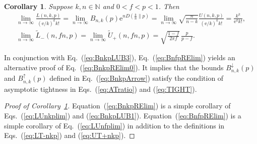 \documentclass[aop]{imsart}
\theoremstyle{plain}
\newtheorem{corollary}[theorem]{Corollary}
\theoremstyle{remark}
\newcommand{\rme}{\mathrm{e}}
\newcommand{\bbN}{\mathbb{N}}
\newcommand{\1}{\operatorname{\uppercase\expandafter{\romannumeral1}}}
\newcommand{\2}{\operatorname{\uppercase\expandafter{\romannumeral2}}}
\newcommand{\3}{\operatorname{\uppercase\expandafter{\romannumeral3}}}
\newcommand{\4}{\operatorname{\uppercase\expandafter{\romannumeral4}}}
\newcommand{\5}{\operatorname{\uppercase\expandafter{\romannumeral5}}}
\newcommand{\6}{\operatorname{\uppercase\expandafter{\romannumeral6}}}
\newcommand{\7}{\operatorname{\uppercase\expandafter{\romannumeral7}}}
\newcommand{\8}{\operatorname{\uppercase\expandafter{\romannumeral8}}}
\newcommand{\9}{\operatorname{\uppercase\expandafter{\romannumeral9}}}
\newcommand{\eref}[1]{Eq.~\textup{(\ref{#1})}}
\newcommand{\Eref}[1]{Equation~\textup{(\ref{#1})}}
\newcommand{\eqsref}[2]{Eqs.~(\ref{#1}) and (\ref{#2})}
\newcommand{\crref}[1]{Corollary~\ref{#1}}
\begin{document}
\begin{corollary}\label{cor:TailLim}
	Suppose  $k,n\in \bbN$ and   $0<f<p<1$. Then
	\begin{gather}
	\lim_{n\to \infty}	\frac{L(n,k,p)}{(\rme/k)^k k!}= \lim_{n\to \infty} B_{n,k}(p) \rme^{nD(\frac{k}{n}\| p)}= \lim_{n\to \infty} \sqrt{\frac{n}{n-k}}\frac{U(n,k,p)}{(\rme/k)^k k!}=
	\frac{k^k }{\rme^{k} k!}, \label{eq:BnkpRElim}\\
	\lim_{n\rightarrow \infty} \tilde{L}_-(n,f n,p)
=\lim_{n\rightarrow \infty} \tilde{U}_+(n,f n,p)=\sqrt{\frac{1-f}{2\pi f}}\,\frac{p}{p-f}. \label{eq:BnfpRElim}		
\end{gather} 	
\end{corollary}
In conjunction with \eref{eq:BnkpLUB3},
\eref{eq:BnfpRElim} yields an alternative proof of \eref{eq:BnkpRElim0}. It
implies that the bounds $B_{n,k}^{\downarrow}(p)$ and $B_{n,k}^{\uparrow}(p)$ defined in \eref{eq:BnkpArrow} satisfy the condition of asymptotic tightness in \eqsref{eq:ATratio}{eq:TIGHT}. 


\begin{proof}[Proof of \crref{cor:TailLim}]
	\Eref{eq:BnkpRElim} is a simple corollary of 
	\eqsref{eq:LUnkplim}{eq:BnkpLUB1}.
	\Eref{eq:BnfpRElim} is a simple corollary of  \eref{eq:LUnfplim} in addition to the definitions in \eqsref{eq:LT-nkp}{eq:UT+nkp}. 
\end{proof}
\end{document}
